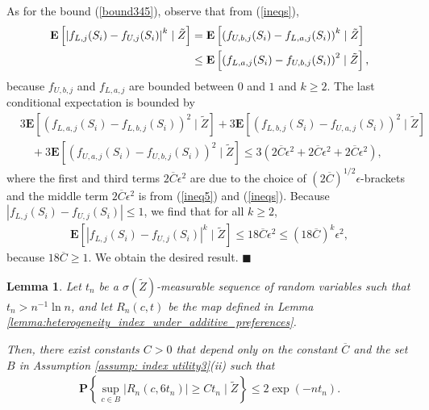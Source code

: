 \documentclass[12pt, fullpage]{amsart}
\newtheorem{lemma}{Lemma}[section]
\theoremstyle{definition}
\theoremstyle{definition}
\theoremstyle{definition}
\begin{document}
\begin{bibunit}[econometrica]
As for the bound (\ref{bound345}), observe that from (\ref{ineqs}),
\begin{align}
	\label{bound345}
	\mathbf{E}\left[ \left| f_{L,j}(S_i) - f_{U,j}(S_i)\right|^k \mid \tilde Z \right] &= \mathbf{E}\left[\left(f_{U,b,j}(S_i) - f_{L,a,j}(S_i) \right)^k \mid \tilde Z \right]\\ \notag
	&\le \mathbf{E}\left[\left(f_{L,a,j}(S_i) - f_{U,b,j}(S_i)\right)^2 \mid \tilde Z \right],
 \end{align}
because $f_{U,b,j}$ and $f_{L,a,j}$ are bounded between $0$ and $1$ and $k \ge 2$. The last conditional expectation is bounded by
\begin{align*}
	&3\mathbf{E}\left[\left(f_{L,a,j}(S_i) - f_{L,b,j}(S_i)\right)^2 \mid \tilde Z \right]+ 3\mathbf{E}\left[\left(f_{L,b,j}(S_i) - f_{U,a,j}(S_i)\right)^2 \mid \tilde Z \right]\\
	&\quad + 3\mathbf{E}\left[\left(f_{U,a,j}(S_i) - f_{U,b,j}(S_i)\right)^2 \mid \tilde Z \right] \le 3(2 \overline C \epsilon^2 + 2 \overline C \epsilon^2 + 2 \overline C \epsilon^2),
\end{align*}
where the first and third terms $2 \overline C \epsilon^2$ are due to the choice of $(2 \overline C )^{1/2} \epsilon$-brackets and the middle term $2 \overline C \epsilon^2$ is from (\ref{ineq5}) and (\ref{ineqs}). Because $\left| f_{L,j}(S_i) - f_{U,j}(S_i)\right| \le 1$, we find that for all $k \ge 2$, 
\begin{align}
    \label{bound34}
    \mathbf{E}\left[ \left| f_{L,j}(S_i) - f_{U,j}(S_i)\right|^k \mid \tilde Z \right] \le 18 \overline C \epsilon^2 \le (18 \overline C)^k \epsilon^2,
\end{align}
because $18 \overline C \ge 1$. We obtain the desired result. $\blacksquare$\medskip

\begin{lemma}
	\label{lemm: Rn(c,t)}
	Let $t_n$ be a $\sigma(\tilde Z)$-measurable sequence of random variables such that $t_n > n^{-1} \ln n$, and let $R_n(c,t)$ be the map defined in Lemma \ref{lemma:heterogeneity_index_under_additive_preferences}.
	
	Then, there exist constants $C>0$ that depend only on the constant $\overline C$ and the set $B$ in Assumption \ref{assump: index utility3}(ii) such that
	\begin{align}
        \label{ineq}
		\mathbf{P}\left\{ \sup_{c \in B} |R_n(c,6t_n)| \ge C t_n \mid \tilde Z \right\} \le 2 \exp\left( - n t_n\right).
	\end{align}
\end{lemma}
\medskip


\end{bibunit}
\end{document}
